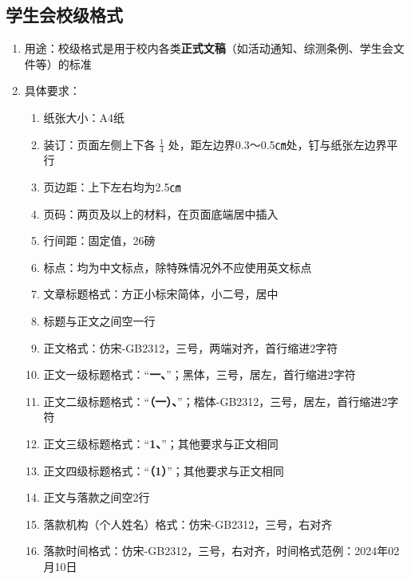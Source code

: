 \subsection[学生会校级格式]{学生会校级格式}
\begin{enumerate}
    \item 用途：校级格式是用于校内各类\textbf{正式文稿}（如活动通知、综测条例、学生会文件等）的标准
    \item 具体要求：
          \begin{enumerate}
              \item 纸张大小：A4纸
              \item 装订：页面左侧上下各 $\frac{1}{4}$ 处，距左边界0.3～0.5㎝处，钉与纸张左边界平行
              \item 页边距：上下左右均为2.5㎝
              \item 页码：两页及以上的材料，在页面底端居中插入
              \item 行间距：固定值，26磅
              \item 标点：均为中文标点，除特殊情况\footnotemark 外不应使用英文标点
              \item 文章标题格式：方正小标宋简体，小二号，居中
              \item 标题与正文之间空一行
              \item 正文格式：仿宋-GB2312，三号，两端对齐，首行缩进2字符
              \item 正文一级标题格式：“\textbf{一、}”；黑体，三号，居左，首行缩进2字符
              \item 正文二级标题格式：“\textbf{（一）、}”；楷体-GB2312，三号，居左，首行缩进2字符
              \item 正文三级标题格式：“\textbf{1、}”；其他要求与正文相同
              \item 正文四级标题格式：“\textbf{（1）}”；其他要求与正文相同
              \item 正文与落款之间空2行
              \item 落款机构（个人姓名）格式：仿宋-GB2312，三号，右对齐
              \item 落款时间格式：仿宋-GB2312，三号，右对齐，时间格式范例：2024年02月10日
          \end{enumerate}
\end{enumerate}


